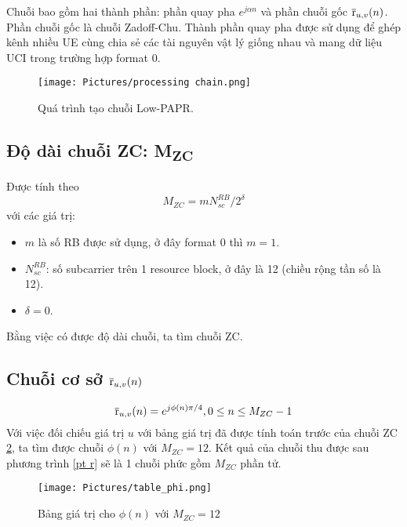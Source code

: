  Chuỗi bao gồm hai thành phần: phần quay pha $e^{j\alpha n}$ và phần chuỗi gốc $\overline{\rm r}_{u,v}(n)$. Phần chuỗi gốc là chuỗi Zadoff-Chu. Thành phần quay pha được sử dụng để ghép kênh nhiều UE cùng chia sẻ các tài nguyên vật lý giống nhau và mang dữ liệu UCI trong trường hợp format 0. 
 
\begin{figure}[H]
    \centering
    \texttt{[image: Pictures/processing chain.png]}
    \caption{Quá trình tạo chuỗi Low-PAPR.\cite{kivijakola2024pucch}}
    \label{fig:enter-label}
\end{figure}


\subsection{Độ dài chuỗi ZC: M\textsubscript{ZC}}
Được tính theo \[ M_{ZC} = mN^{RB}_{sc}/2^{\delta} \] với các giá trị:
\begin{itemize}
    \item $m$ là số RB được sử dụng, ở đây format 0 thì $m=1$.
    \item $N^{RB}_{sc}$: số subcarrier trên 1 resource block, ở đây là 12 (chiều rộng tần số là 12).
    \item $\delta =0$. 
\end{itemize}
 Bằng việc có được độ dài chuỗi, ta tìm chuỗi ZC.
\subsection{Chuỗi cơ sở $\overline{\rm r}_{u,v}(n)$}
\[
\overline{\rm r}_{u,v}(n)=e^{j\phi(n)\pi/4},\space  0 \leq n \leq M_{ZC}-1 \label{pt r}
\]
 Với việc đối chiếu giá trị \textbf{$u$} với bảng giá trị đã được tính toán trước của chuỗi ZC \ref{fig:phi(n)}, ta tìm được chuỗi $\phi(n)$ với $M_{ZC}=12$. Kết quả của chuỗi thu được sau phương trình \ref{pt r} sẽ là 1 chuỗi phức gồm $M_{ZC}$ phần tử. 
 \begin{figure}[H]
     \centering
     \texttt{[image: Pictures/table\_phi.png]}
     \caption{Bảng giá trị cho $\phi(n)$ với $M_{ZC}=12$ \cite{3gpp38.211}}
     \label{fig:phi(n)}
 \end{figure}
